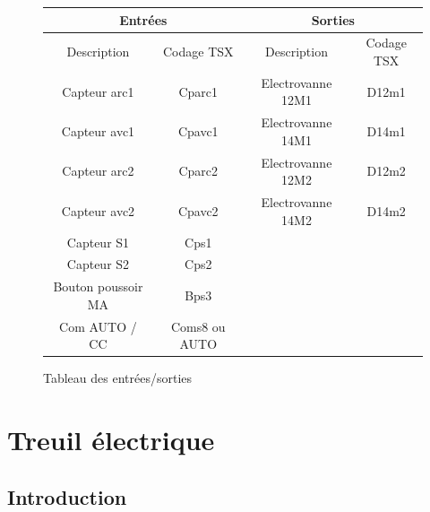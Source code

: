 \begin{figure}[htbp]
\begin{center}
\begin{tabular}{|c|c||c|c|}
\hline
\multicolumn{2}{|c||}{\textbf{Entrées}} & \multicolumn{2}{c|}{\textbf{Sorties}} \\
\hline
Description & Codage TSX & Description & Codage TSX \\
\hline
Capteur arc1 & Cparc1 & Electrovanne 12M1 & D12m1 \\
Capteur avc1 & Cpavc1 & Electrovanne 14M1 & D14m1 \\
Capteur arc2 & Cparc2 & Electrovanne 12M2 & D12m2 \\
Capteur avc2 & Cpavc2 & Electrovanne 14M2 & D14m2 \\
Capteur S1 & Cps1  & & \\
Capteur S2 & Cps2  & & \\
Bouton poussoir MA & Bps3  & & \\
Com AUTO / CC & Coms8 ou AUTO & & \\
\hline
\end{tabular}
\caption{Tableau des entrées/sorties}
\label{fig:tableau1}
\end{center}
\end{figure}

\newpage

\section{Treuil électrique}


\subsection{Introduction}



